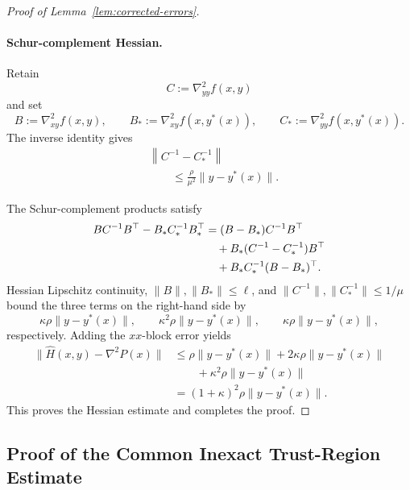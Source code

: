 \begin{proof}[Proof of Lemma~\ref{lem:corrected-errors}]
\paragraph{Schur-complement Hessian.}
Retain
\[
    C:=\nabla^2_{yy}f(x,y)
\]
and set
\[
    B:=\nabla^2_{xy}f(x,y),
    \qquad
    B_*:=\nabla^2_{xy}f(x,y^*(x)),
    \qquad
    C_*:=\nabla^2_{yy}f(x,y^*(x)).
\]
The inverse identity gives
\begin{equation}
\begin{aligned}
    &
    \left\|
    C^{-1}-C_*^{-1}
    \right\|
    \\
    &\qquad\le
    \frac{\rho}{\mu^2}
    \|y-y^*(x)\|.
\end{aligned}
\label{eq:app-inverse-difference}
\end{equation}

The Schur-complement products satisfy
\begin{align}
    BC^{-1}B^\top-B_*C_*^{-1}B_*^\top
    &=
    (B-B_*)C^{-1}B^\top
    \notag\\
    &\quad+
    B_*(C^{-1}-C_*^{-1})B^\top
    \notag\\
    &\quad+
    B_*C_*^{-1}(B-B_*)^\top.
    \label{eq:app-schur-telescope}
\end{align}
Hessian Lipschitz continuity,
$\|B\|,\|B_*\|\le\ell$, and
$\|C^{-1}\|,\|C_*^{-1}\|\le1/\mu$
bound the three terms on the right-hand side by
\[
    \kappa\rho\|y-y^*(x)\|,
    \qquad
    \kappa^2\rho\|y-y^*(x)\|,
    \qquad
    \kappa\rho\|y-y^*(x)\|,
\]
respectively.
Adding the $xx$-block error yields
\begin{align*}
    \|\widehat H(x,y)-\nabla^2P(x)\|
    &\le
    \rho\|y-y^*(x)\|
    +
    2\kappa\rho\|y-y^*(x)\|
    \\
    &\qquad+
    \kappa^2\rho\|y-y^*(x)\|
    \\
    &=
    (1+\kappa)^2\rho
    \|y-y^*(x)\|.
\end{align*}
This proves the Hessian estimate and completes the proof.
\end{proof}


\subsection{Proof of the Common Inexact Trust-Region Estimate}
\label{app:common-tr-step}


